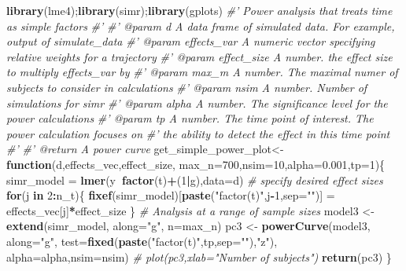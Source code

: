 \documentclass[]{article}
\newenvironment{Shaded}{\begin{snugshade}}{\end{snugshade}}
\newcommand{\KeywordTok}[1]{\textcolor[rgb]{0.13,0.29,0.53}{\textbf{#1}}}
\newcommand{\DataTypeTok}[1]{\textcolor[rgb]{0.13,0.29,0.53}{#1}}
\newcommand{\DecValTok}[1]{\textcolor[rgb]{0.00,0.00,0.81}{#1}}
\newcommand{\FloatTok}[1]{\textcolor[rgb]{0.00,0.00,0.81}{#1}}
\newcommand{\StringTok}[1]{\textcolor[rgb]{0.31,0.60,0.02}{#1}}
\newcommand{\CommentTok}[1]{\textcolor[rgb]{0.56,0.35,0.01}{\textit{#1}}}
\newcommand{\ControlFlowTok}[1]{\textcolor[rgb]{0.13,0.29,0.53}{\textbf{#1}}}
\newcommand{\OperatorTok}[1]{\textcolor[rgb]{0.81,0.36,0.00}{\textbf{#1}}}
\newcommand{\NormalTok}[1]{#1}
\begin{document}
\begin{Shaded}
\begin{Highlighting}[]
\KeywordTok{library}\NormalTok{(lme4);}\KeywordTok{library}\NormalTok{(simr);}\KeywordTok{library}\NormalTok{(gplots)}
\CommentTok{#' Power analysis that treats time as simple factors}
\CommentTok{#' }
\CommentTok{#'  @param d A data frame of simulated data. For example, output of simulate_data}
\CommentTok{#'  @param effects_var A numeric vector specifying relative weights for a trajectory}
\CommentTok{#'  @param effect_size A number. the effect size to multiply effects_var by}
\CommentTok{#'  @param max_m A number.  The maximal numer of subjects to consider in calculations}
\CommentTok{#'  @param nsim A number. Number of simulations for simr}
\CommentTok{#'  @param alpha A number. The significance level for the power calculations}
\CommentTok{#'  @param tp A number. The time point of interest. The power calculation focuses on }
\CommentTok{#'  the ability to detect the effect in this time point}
\CommentTok{#'  }
\CommentTok{#'  @return A power curve}
\NormalTok{get_simple_power_plot<-}\ControlFlowTok{function}\NormalTok{(d,effects_vec,effect_size,}
                                \DataTypeTok{max_n=}\DecValTok{700}\NormalTok{,}\DataTypeTok{nsim=}\DecValTok{10}\NormalTok{,}\DataTypeTok{alpha=}\FloatTok{0.001}\NormalTok{,}\DataTypeTok{tp=}\DecValTok{1}\NormalTok{)\{}
\NormalTok{  simr_model =}\StringTok{ }\KeywordTok{lmer}\NormalTok{(y}\OperatorTok{~}\KeywordTok{factor}\NormalTok{(t)}\OperatorTok{+}\NormalTok{(}\DecValTok{1}\OperatorTok{|}\NormalTok{g),}\DataTypeTok{data=}\NormalTok{d)}
  \CommentTok{# specify desired effect sizes}
  \ControlFlowTok{for}\NormalTok{(j }\ControlFlowTok{in} \DecValTok{2}\OperatorTok{:}\NormalTok{n_t)\{}
    \KeywordTok{fixef}\NormalTok{(simr_model)[}\KeywordTok{paste}\NormalTok{(}\StringTok{"factor(t)"}\NormalTok{,j}\OperatorTok{-}\DecValTok{1}\NormalTok{,}\DataTypeTok{sep=}\StringTok{""}\NormalTok{)] =}\StringTok{ }\NormalTok{effects_vec[j]}\OperatorTok{*}\NormalTok{effect_size}
\NormalTok{  \}}
  \CommentTok{# Analysis at a range of sample sizes}
\NormalTok{  model3 <-}\StringTok{ }\KeywordTok{extend}\NormalTok{(simr_model, }\DataTypeTok{along=}\StringTok{"g"}\NormalTok{, }\DataTypeTok{n=}\NormalTok{max_n)}
\NormalTok{  pc3 <-}\StringTok{ }\KeywordTok{powerCurve}\NormalTok{(model3, }\DataTypeTok{along=}\StringTok{"g"}\NormalTok{,}
                    \DataTypeTok{test=}\KeywordTok{fixed}\NormalTok{(}\KeywordTok{paste}\NormalTok{(}\StringTok{"factor(t)"}\NormalTok{,tp,}\DataTypeTok{sep=}\StringTok{""}\NormalTok{),}\StringTok{"z"}\NormalTok{),}
                    \DataTypeTok{alpha=}\NormalTok{alpha,}\DataTypeTok{nsim=}\NormalTok{nsim)}
  \CommentTok{# plot(pc3,xlab="Number of subjects")}
  \KeywordTok{return}\NormalTok{(pc3)}
\NormalTok{\}}


\end{Highlighting}
\end{Shaded}
\end{document}
